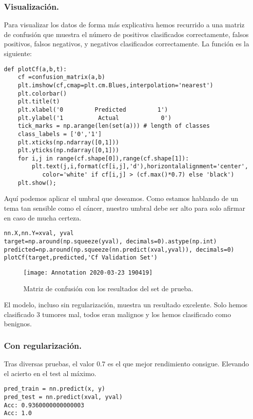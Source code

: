 \documentclass[a4paper,11pt]{article}
\begin{document}
\subsubsection{Visualización.}
Para visualizar los datos de forma más explicativa hemos recurrido a una matriz de confusión que muestra el número de positivos clasificados correctamente, falsos positivos, falsos negativos, y  negativos clasificados correctamente. La función es la siguiente:
\begin{lstlisting}
def plotCf(a,b,t):
    cf =confusion_matrix(a,b)
    plt.imshow(cf,cmap=plt.cm.Blues,interpolation='nearest')
    plt.colorbar()
    plt.title(t)
    plt.xlabel('0         Predicted         1')
    plt.ylabel('1          Actual            0')
    tick_marks = np.arange(len(set(a))) # length of classes
    class_labels = ['0','1']
    plt.xticks(np.ndarray([0,1]))
    plt.yticks(np.ndarray([0,1]))
    for i,j in range(cf.shape[0]),range(cf.shape[1]):
        plt.text(j,i,format(cf[i,j],'d'),horizontalalignment='center',
           color='white' if cf[i,j] > (cf.max()*0.7) else 'black')
    plt.show();
\end{lstlisting}
Aquí podemos aplicar el umbral que deseamos. Como estamos hablando de un tema tan sensible como el cáncer, nuestro umbral debe ser alto para solo afirmar en caso de mucha certeza.

\begin{lstlisting}
nn.X,nn.Y=xval, yval 
target=np.around(np.squeeze(yval), decimals=0).astype(np.int)
predicted=np.around(np.squeeze(nn.predict(xval,yval)), decimals=0)
plotCf(target,predicted,'Cf Validation Set')
\end{lstlisting}
\begin{figure}[H]
\centering
\texttt{[image: Annotation 2020-03-23 190419]}
\caption{Matriz de confusión con los resultados del set de prueba.}
\end{figure}
El modelo, incluso sin regularización, muestra un resultado excelente. Solo hemos clasificado 3 tumores mal, todos eran malignos  y los hemos clasificado como benignos.
\subsubsection{Con regularización.}
Tras diversas pruebas, el valor 0.7 es el que mejor rendimiento consigue. Elevando el acierto en el test al máximo.
\begin{lstlisting}
pred_train = nn.predict(x, y)
pred_test = nn.predict(xval, yval)
Acc: 0.9360000000000003
Acc: 1.0
\end{lstlisting}
\end{document}
